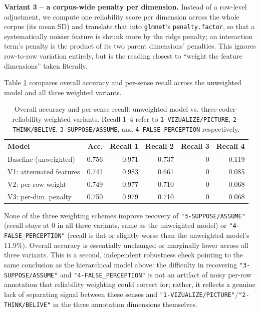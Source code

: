 \documentclass[
]{article}
\begin{document}
\textbf{Variant 3 -- a corpus-wide penalty per dimension.} Instead of a
row-level adjustment, we compute one reliability score per dimension
across the whole corpus (its mean SD) and translate that into
\texttt{glmnet}`s \texttt{penalty.factor}, so that a systematically
noisier feature is shrunk more by the ridge penalty; an interaction
term's penalty is the product of its two parent dimensions' penalties.
This ignores row-to-row variation entirely, but is the reading closest
to ``weight the feature dimensions'' taken literally.

Table \ref{tab:weightedComparison} compares overall accuracy and
per-sense recall across the unweighted model and all three weighted
variants.

\begin{table}[H]
\centering
\caption{\label{tab:unnamed-chunk-20}Overall accuracy and per-sense recall: unweighted model vs. three coder-reliability weighted variants. Recall 1--4 refer to \texttt{1-VIZUALIZE/PICTURE}, \texttt{2-THINK/BELIVE}, \texttt{3-SUPPOSE/ASSUME}, and \texttt{4-FALSE\_PERCEPTION} respectively.\label{tab:weightedComparison}}
\centering
\fontsize{9}{11}\selectfont
\begin{tabular}[t]{lrrrrr}
\toprule
Model & Acc. & Recall 1 & Recall 2 & Recall 3 & Recall 4\\
\midrule
Baseline (unweighted) & 0.756 & 0.971 & 0.737 & 0 & 0.119\\
V1: attenuated features & 0.741 & 0.983 & 0.661 & 0 & 0.085\\
V2: per-row weight & 0.749 & 0.977 & 0.710 & 0 & 0.068\\
V3: per-dim. penalty & 0.750 & 0.979 & 0.710 & 0 & 0.068\\
\bottomrule
\end{tabular}
\end{table}

None of the three weighting schemes improve recovery of
\texttt{"3-SUPPOSE/ASSUME"} (recall stays at 0 in all three variants,
same as the unweighted model) or \texttt{"4-FALSE\_PERCEPTION"} (recall
is flat or slightly worse than the unweighted model's 11.9\%). Overall
accuracy is essentially unchanged or marginally lower across all three
variants. This is a second, independent robustness check pointing to the
same conclusion as the hierarchical model above: the difficulty in
recovering \texttt{"3-SUPPOSE/ASSUME"} and
\texttt{"4-FALSE\_PERCEPTION"} is not an artifact of noisy per-row
annotation that reliability weighting could correct for; rather, it
reflects a genuine lack of separating signal between these senses and
\texttt{"1-VIZUALIZE/PICTURE"}/\texttt{"2-THINK/BELIVE"} in the three
annotation dimensions themselves.
\end{document}

